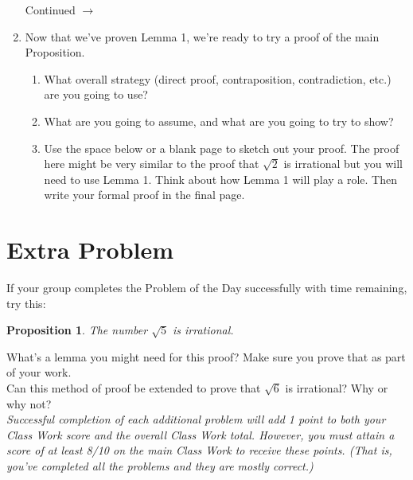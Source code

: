\documentclass[11pt]{article}
\def\pageturn{\vfill
\begin{flushright}
	\begin{small}
		Continued $\rightarrow$
	\end{small}
\end{flushright}
\newpage}
\newtheorem{proposition}{Proposition}
\begin{document}
\begin{enumerate}
	\pageturn
	
	\item Now that we've proven Lemma 1, we're ready to try a proof of the main Proposition. 
	\begin{enumerate}
		\item What overall strategy (direct proof, contraposition, contradiction, etc.) are you going to use? 
		
		\vspace{0.5in}
		
		\item What are you going to assume, and what are you going to try to show? 
		
		\vspace{1in}
		
		\item Use the space below or a blank page to sketch out your proof. The proof here might be very similar to the proof that $\sqrt{2}$ is irrational but you will need to use Lemma 1. Think about how Lemma 1 will play a role. Then write your formal proof in the final page. 
	\end{enumerate}
	
\end{enumerate}


\vfill

\section*{Extra Problem}

If your group completes the Problem of the Day successfully with time remaining, try this: 

\begin{proposition}
	The number $\sqrt{5}$ is irrational. 
\end{proposition}

What's a lemma you might need for this proof? Make sure you prove that as part of your work. \\

Can this method of proof be extended to prove that $\sqrt{6}$ is irrational? Why or why not? \\


\emph{Successful completion of each additional problem will add 1 point to both your Class Work score and the overall Class Work total. However, you must attain a score of at least 8/10 on the main Class Work to receive these points. (That is, you've completed all the problems and they are mostly correct.) }	
\end{document}
